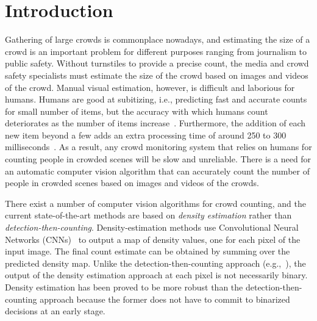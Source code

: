 \documentclass[runningheads]{llncs}
\begin{document}
\section{Introduction}
Gathering of large crowds is commonplace nowadays, and estimating the size of a crowd is an important problem for different purposes ranging from journalism to public safety.  Without turnstiles to provide a precise count, the media and crowd safety specialists must estimate the size of the crowd based on images and videos of the crowd. Manual visual estimation, however, is difficult and laborious for humans. Humans are good at subitizing, i.e., predicting fast and accurate counts for small number of items, but the accuracy with which humans count deteriorates as the number of items increase~\cite{kaufman1949discrimination}. Furthermore, the addition of each new item beyond a few adds an extra processing time of around 250 to 300 milliseconds~\cite{trick1994small}. As a result, any crowd monitoring system that relies on humans for counting people in crowded scenes will be slow and unreliable. There is a need for an automatic computer vision algorithm that can accurately count the number of people in crowded scenes based on images and videos of the crowds. 

There exist a number of computer vision algorithms for crowd counting, and the current state-of-the-art methods are based on \textsl{density estimation} rather than \textsl{detection-then-counting}. Density-estimation methods use Convolutional Neural Networks (CNNs)~\cite{LeCun-et-al-NC89,Krizhevsky-et-al-NIPS12} to output a map of density values, one for each pixel of the input image. The final count estimate can be obtained by summing over the predicted density map. Unlike the detection-then-counting approach (e.g.,~\cite{Hoai-Zisserman-CVPR14}), the output of the density estimation approach at each pixel is not necessarily binary. Density estimation has been proved to be more robust than the detection-then-counting approach because the former does not have to commit to binarized decisions at an early stage. 
\end{document}
